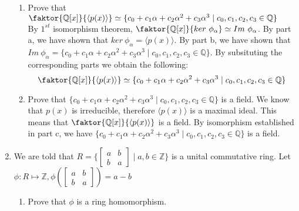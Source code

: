 \documentclass[12pt]{article}
\begin{document}
\begin{enumerate}
\begin{enumerate}
			\item Prove that $\faktor{\mathbb{Q}[x]}{\langle p(x) \rangle} \simeq
				\{c_0 + c_1 \alpha + c_2 \alpha^2 + c_3 \alpha^3 \mid c_0, c_1, c_2, c_3
					\in \mathbb{Q}\}$\\
				By $1^{st}$ isomorphism theorem, $\faktor{\mathbb{Q}[x]}{ker\
				\phi_\alpha} \simeq Im\ \phi_\alpha$. By part a, we have shown that
				$ker\ \phi_\alpha = \langle p(x) \rangle$. By part b, we have shown that 
				$Im\ \phi_\alpha = \{c_0 + c_1 \alpha + c_2 \alpha^2 + c_3 \alpha^3 \mid
				c_0, c_1, c_2, c_3 \in \mathbb{Q}\}$. By subsituting the corresponding
				parts we obtain the following:
				$$\faktor{\mathbb{Q}[x]}{\langle p(x) \rangle} \simeq
				\{c_0 + c_1 \alpha + c_2 \alpha^2 + c_3 \alpha^3 \mid c_0, c_1, c_2, c_3
					\in \mathbb{Q}\}$$

			\item Prove that $\{c_0 + c_1 \alpha + c_2 \alpha^2 + c_3 \alpha^3 \mid
					c_0, c_1, c_2, c_3 \in \mathbb{Q}\}$ is a field.
					We know that $p(x)$ is irreducible, therefore $\langle p(x) \rangle$
					is a maximal ideal. This means that $\faktor{\mathbb{Q}[x]}{\langle
					p(x) \rangle}$ is a field. By isomorphism established in part c, we
					have $\{c_0 + c_1 \alpha + c_2 \alpha^2 + c_3 \alpha^3 \mid
					c_0, c_1, c_2, c_3 \in \mathbb{Q}\}$ is a field.

		\end{enumerate}

	\item We are told that $R=\bigg\{\begin{bmatrix} a & b\\ b & a
		\end{bmatrix} \mid a, b \in \mathbb{Z}\bigg\}$ is a unital commutative ring.
		Let $\phi : R \mapsto \mathbb{Z}, \phi\left(\begin{bmatrix} a & b\\ b & a
		\end{bmatrix}\right) = a-b$

		\begin{enumerate}
			\item Prove that $\phi$ is a ring homomorphism.

\end{enumerate}
\end{enumerate}
\end{document}
